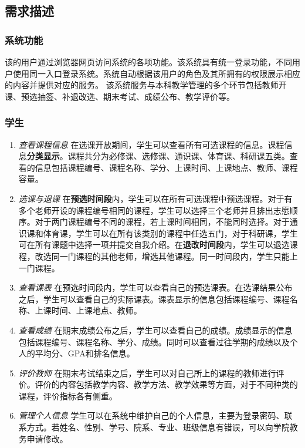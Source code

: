 \subsection{需求描述}

\subsubsection{系统功能}
\ttfamily
该的用户通过浏览器{\sffamily 网页}访问系统的各项功能。该系统具有{\sffamily 统一登录}功能，不同用户使用同一入口登录系统。系统自动根据该用户的角色及其所拥有的权限展示相应的内容并提供对应的服务。
该系统服务与本科教学管理的多个环节包括教师开课、预选抽签、补退改选、期末考试、成绩公布、教学评价等。

\normalfont

\subsubsection{学生}
\begin{enumerate}
    \item \textit{查看课程信息} \quad 在选课开放期间，学生可以查看所有可选课程的信息。课程信息\textbf{分类显示}。课程共分为必修课、选修课、通识课、体育课、科研课五类。查看的信息包括课程编号、课程名称、学分、上课时间、上课地点、教师、课程容量。
    \item \textit{选课与退课} \quad 在\textbf{预选时间段}内，学生可以在所有可选课程中预选课程。对于有多个老师开设的课程编号相同的课程，学生可以选择三个老师并且排出志愿顺序。对于两门课程编号不同的课程，若上课时间相同，不能同时选择。对于通识课和体育课，学生可以在所有该类别的课程中任选五门，对于科研课，学生可在所有课题中选择一项并提交自我介绍。在\textbf{退改时间段}内，学生可以退选课程，改选同一门课程的其他老师，增选其他课程。同一时间段内，学生只能上一门课程。
    \item \textit{查看课表} \quad 在预选时间段内，学生可以查看自己的预选课表。在选课结果公布之后，学生可以查看自己的实际课表。课表显示的信息包括课程编号、课程名称、上课时间、上课地点、教师。
    \item \textit{查看成绩} \quad 在期末成绩公布之后，学生可以查看自己的成绩。成绩显示的信息包括课程编号、课程名称、学分、成绩。同时可以查看过往学期的成绩以及个人的平均分、GPA和排名信息。
    \item \textit{评价教师} \quad 在期末考试结束之后，学生可以对自己所上的课程的教师进行评价。评价的内容包括教学内容、教学方法、教学效果等方面，对于不同种类的课程，评价指标各有侧重。
    \item \textit{管理个人信息} \quad 学生可以在系统中维护自己的个人信息，主要为登录密码、联系方式。若姓名、性别、学号、院系、专业、班级信息有错误，可以向学院教务申请修改。
\end{enumerate}


